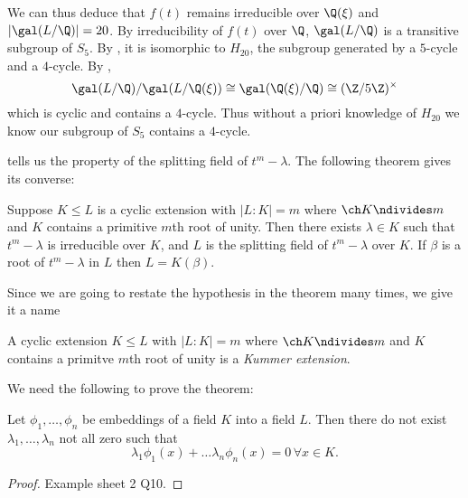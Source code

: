 \documentclass[a4paper]{article}
\begin{document}
\begin{eg}
\begin{enumerate}
   We can thus deduce that \(f(t)\) remains irreducible over \(\Q(\xi)\) and \(|\gal(L/\Q)| = 20\). By irreducibility of \(f(t)\) over \(\Q\), \(\gal(L/\Q)\) is a transitive subgroup of \(S_5\). By , it is isomorphic to \(H_{20}\), the subgroup generated by a \(5\)-cycle and a \(4\)-cycle. By ,
   \[
     \gal(L/\Q)/\gal(L/\Q(\xi)) \cong \gal(\Q(\xi)/\Q) \cong (\Z/5\Z)^\times
   \]
   which is cyclic and contains a \(4\)-cycle. Thus without a priori knowledge of \(H_{20}\) we know our subgroup of \(S_5\) contains a \(4\)-cycle.
 \end{enumerate}
\end{eg}

 tells us the property of the splitting field of \(t^m - \lambda\). The following theorem gives its converse:

\begin{theorem}
  \label{thm:kummer theory}
  Suppose \(K \leq L\) is a cyclic extension with \(|L:K| = m\) where \(\ch K \ndivides m\) and \(K\) contains a primitive \(m\)th root of unity. Then there exists \(\lambda \in K\) such that \(t^m - \lambda\) is irreducible over \(K\), and \(L\) is the splitting field of \(t^m - \lambda\) over \(K\). If \(\beta\) is a root of \(t^m - \lambda\) in \(L\) then \(L = K(\beta)\).
\end{theorem}

Since we are going to restate the hypothesis in the theorem many times, we give it a name

\begin{definition}
  A cyclic extension \(K \leq L\) with \(|L:K| = m\) where \(\ch K \ndivides m\) and \(K\) contains a primitve \(m\)th root of unity is a \emph{Kummer extension}.
\end{definition}

We need the following to prove the theorem:

\begin{lemma}
  \label{lem:linear independence of group characters}
  Let \(\phi_1, \dots, \phi_n\) be embeddings of a field \(K\) into a field \(L\). Then there do not exist \(\lambda_1, \dots, \lambda_n\) not all zero such that
  \[
    \lambda_1 \phi_1(x) + \dots \lambda_n \phi_n(x) = 0 \, \forall x \in K.
  \]
\end{lemma}

\begin{proof}
  Example sheet 2 Q10.
\end{proof}
\end{document}
